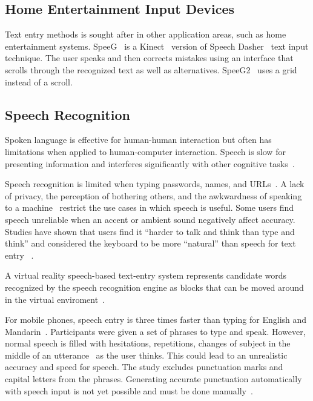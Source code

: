 \subsection{Home Entertainment Input Devices}
Text entry methods is sought after in other application areas, such as home entertainment systems.
SpeeG~\cite{hoste2012speeg} is a Kinect~\cite{geerse2015kinematic} version of Speech Dasher~\cite{vertanen2010speech} text input technique.
The user speaks and then corrects mistakes using an interface that scrolls through the recognized text as well as alternatives.
SpeeG2~\cite{hoste2013speeg2} uses a grid instead of a scroll.

\subsection{Speech Recognition}
Spoken language is effective for human-human interaction but often has limitations when applied to human-computer interaction.
Speech is slow for presenting information and interferes significantly with other cognitive tasks~\cite{shneiderman2000limits}.

Speech recognition is limited when typing passwords, names, and URLs~\cite{bazzi2002modelling}. 
A lack of privacy, the perception of bothering others, and the awkwardness of speaking to a machine~\cite{sawhney2000nomadic} restrict the use cases in which speech is useful.
Some users find speech unreliable when an accent or ambient sound negatively affect accuracy.
Studies have shown that users find it ``harder to talk and think than type and think'' and considered the keyboard to be more ``natural'' than speech for text entry ~\cite{Karat:1999:PEC:302979.303160}.

A virtual reality speech-based text-entry system represents candidate words recognized by the speech recognition engine as blocks that can be moved around in the virtual enviroment~\cite{osawa2002multimodal}. 

For mobile phones, speech entry is three times faster than typing for English and Mandarin~\cite{ruan2016speech}.  
Participants were given a set of phrases to type and speak.
However, normal speech is filled with hesitations, repetitions, changes of subject in the middle of an utterance~\cite{forsberg2003speech} as the user thinks.
This could lead to an unrealistic accuracy and speed for speech.  
The study excludes punctuation marks and capital letters from the phrases.
Generating accurate punctuation  automatically with speech input is not yet possible and must be done manually~\cite{chen1999speech}.

